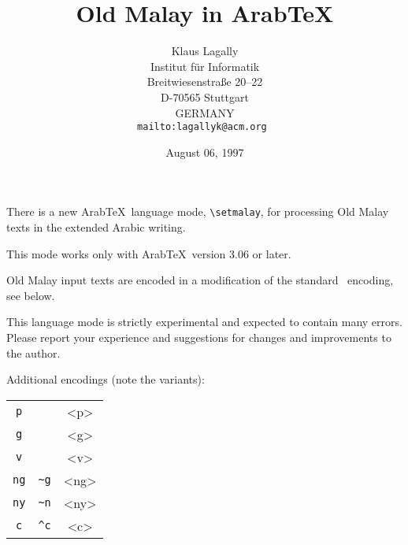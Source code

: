 \documentclass[12pt]{article}
\begin{document}
\title{Old Malay in Arab\TeX} 
\author
{Klaus Lagally\\
Institut f\"ur Informatik\\
Breitwiesenstra\ss e 20--22\\
D-70565 Stuttgart\\
GERMANY\\
\tt mailto:lagallyk@acm.org
}
\date{August 06, 1997}
\maketitle

\setmalay

\vspace*{-05mm}
There is a new Arab\TeX\ language mode, \verb+\setmalay+,
for processing Old Malay texts in the extended Arabic writing.

This mode works only with Arab\TeX\ version 3.06 or later.

Old Malay input texts are encoded in a modification of the
standard \ArabTeX\ encoding, see below.

This language mode is strictly experimental
and expected to contain many errors.
Please report your experience and suggestions 
for changes and improvements to the author.

Additional encodings (note the variants):

\begin{center}
\Large
\begin{tabular}{|cc|c|}
\hline
\verb+p+	&		&<p> \\
\verb+g+	&		&<g> \\
\verb+v+	& 		&<v> \\
\verb+ng+	&\verb+~g+	&<ng>\\
\verb+ny+	&\verb+~n+	&<ny>\\
\verb+c+	&\verb+^c+	&<c> \\
\hline
\end{tabular}
\end{center}
\end{document}
